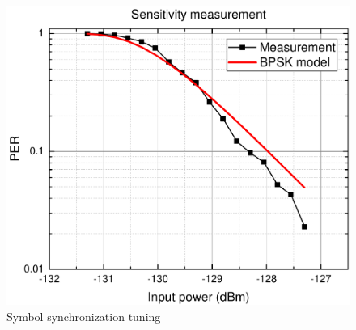 \begin{figure}
    \centering
    \includegraphics[width=0.6\paperwidth]{img/5/sensitivityG.pdf}
    \caption{Symbol synchronization tuning}
    \label{sensitivity_test_model}
\end{figure}